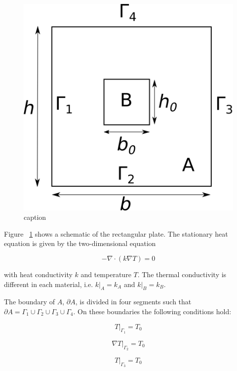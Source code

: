 \documentclass[10pt,a4paper]{article}
\begin{document}
	\begin{figure}[t]
		\centering
		\includegraphics{schem.png}
		\caption{caption}
		\label{fig:schem}
	
	\end{figure}

Figure ~\ref{fig:schem} shows a schematic of the rectangular plate. The stationary heat equation is given by the two-dimensional equation 

\begin{equation}
	-\nabla \cdot (k \nabla T) = 0
\end{equation}

with heat conductivity $k$ and temperature $T$. The thermal conductivity is different in each material, i.e. $ k|_A = k_A $ and $k|_B = k_B $.

The boundary of $A$, $\partial A$,  is divided in four segments such that $\partial A = \Gamma_1 \cup  \Gamma_2 \cup  \Gamma_3 \cup  \Gamma_4$. On these boundaries the following conditions hold:

\begin{equation}
T|_{\Gamma_1} = T_0
\end{equation}

\begin{equation}
\nabla T|_{\Gamma_2} = T_0
\end{equation}

\begin{equation}
T|_{\Gamma_3} = T_0
\end{equation}
\end{document}
